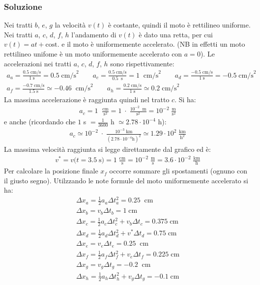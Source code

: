\documentclass[12pt,a4paper]{book}
\begin{document}
\subsubsection*{Soluzione}
Nei tratti $b$, $e$, $g$ la velocità $v(t)$ è costante, quindi il moto è rettilineo uniforme. Nei tratti $a$, $c$, $d$, $f$, $h$ l'andamento di $v(t)$ è dato una retta, per cui $v(t)=at + \text{cost}.$ e il moto è uniformemente accelerato. (NB in effetti un moto rettilineo unifome è un moto uniformemente accelerato con $a=0$). Le accelerazioni nei tratti $a$, $c$, $d$, $f$, $h$ sono rispettivamente: 
\begin{gather*}
a_a=\frac{0.5 \; \text{cm/s}}{1 \; \text{s}}=0.5  \;\text{cm/s}^2 \qquad a_c=\frac{0.5 \; \text{cm/s}}{0.5 \;\; \text{s}}=1 \; \;\text{cm/s}^2 \qquad a_d=\frac{-0.5 \; \text{cm/s}}{1 \; \text{s}}=-0.5 \; \text{cm/s}^2 \\ a_f=\frac{-0.7 \; \text{cm/s}}{1.5 \; \text{s}}\simeq -0.46 \; \;\text{cm/s}^2 \qquad a_h=\frac{0.2 \; \text{cm/s}}{1 \; \text{s}}\simeq 0.2 \; \text{cm/s}^2 
\end{gather*}
La massima accelerazione è raggiunta quindi nel tratto $c$. Si ha: 
\begin{gather*}
a_c=1 \; \;\frac{\text{cm}}{\text{s}^2} = 1 \;\cdot \;\frac{10^{-2} \;\; \text{m}}{\text{s}^2}= 10^{-2} \;\frac{\text{m}}{\text{s}^2}
\end{gather*}
e anche (ricordando che $1$ s $= \frac{1}{3600}$ h $\simeq 2.78 \cdot 10^{-4}$ h):
\begin{gather*}
a_c \simeq  10^{-2} \;\cdot \;\frac{10^{-3}  \;\text{km}}{(2.78 \cdot 10^{-4}\text{h})^2} \simeq 1.29 \cdot 10^2 \; \frac{\text{km}}{\text{h}^2} 
\end{gather*}
La massima velocità raggiunta si legge direttamente dal grafico ed è:
\begin{gather*}
v^*=v \big(t=3.5 \; \text{s}\big)= 1  \;\frac{\text{cm}}{\text{s}} = 10^{-2} \;\frac{\text{m}}{\text{s}} = 3.6 \cdot 10^{-2}  \;\frac{\text{km}}{\text{h}}
\end{gather*}
Per calcolare la posizione finale $x_f$ occorre sommare gli spostamenti (ognuno con il giusto segno). Utilzzando le note formule del moto uniformemente accelerato si ha:
\begin{gather*}
\Delta x_a= \frac{1}{2} a_a \Delta t_a^2 = 0.25 \; \;\text{cm} \\
\Delta x_b= v_b \Delta t_b = 1 \; \text{cm} \\
\Delta x_c= \frac{1}{2} a_c \Delta t_c^2  + v_b \Delta t_c = 0.375 \; \text{cm} \\
\Delta x_d= \frac{1}{2} a_d \Delta t_d^2  + v^* \Delta t_d = 0.75 \; \text{cm} \\
\Delta x_e= v_e \Delta t_e = 0.25 \; \;\text{cm} \\
\Delta x_f= \frac{1}{2} a_f \Delta t_f^2 + v_e \Delta t_f = 0.225 \;\text{cm} \\
\Delta x_g=  v_g \Delta t_g = - 0.2 \; \;\text{cm} \\
\Delta x_h= \frac{1}{2} a_h \Delta t_h^2 + v_g \Delta t_g = -0.1 \;\text{cm} 
\end{gather*}
\end{document}
